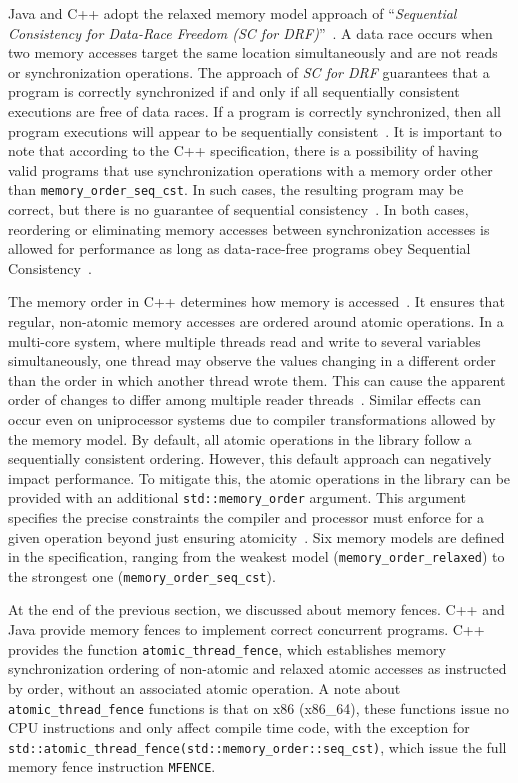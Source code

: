 Java and C++ adopt the relaxed memory model approach of ``\emph{Sequential Consistency for Data-Race Freedom (SC for DRF)}''~\cite{DBLP_conf_isca_AdveH90}.  A data race occurs when two memory accesses target the same location simultaneously and are not reads or synchronization operations. The approach of \emph{SC for DRF} guarantees that a program is correctly synchronized if and only if all sequentially consistent executions are free of data races. If a program is correctly synchronized, then all program executions will appear to be sequentially consistent~\cite{javamemorymodelspec}. It is important to note that according to the C++ specification, there is a possibility of having valid programs that use synchronization operations with a memory order other than \texttt{memory\_order\_seq\_cst}. In such cases, the resulting program may be correct, but there is no guarantee of sequential consistency~\cite{DBLP_conf_pldi_BoehmA08}. In both cases, reordering or eliminating memory accesses between synchronization accesses is allowed for performance as long as data-race-free programs obey Sequential Consistency~\cite{DBLP_series_synthesis_2020Nagarajan}.

The memory order in C++ determines how memory is accessed~\cite{memoryOrderCpp2020}. It ensures that regular, non-atomic memory accesses are ordered around atomic operations. In a multi-core system, where multiple threads read and write to several variables simultaneously, one thread may observe the values changing in a different order than the order in which another thread wrote them. This can cause the apparent order of changes to differ among multiple reader threads~\cite{memoryOrderCpp2020}. Similar effects can occur even on uniprocessor systems due to compiler transformations allowed by the memory model. By default, all atomic operations in the library follow a sequentially consistent ordering. However, this default approach can negatively impact performance. To mitigate this, the atomic operations in the library can be provided with an additional \texttt{std::memory\_order} argument. This argument specifies the precise constraints the compiler and processor must enforce for a given operation beyond just ensuring atomicity~\cite{memoryOrderCpp2020}. Six memory models are defined in the specification, ranging from the weakest model (\texttt{memory\_order\_relaxed}) to the strongest one (\texttt{memory\_order\_seq\_cst}).

At the end of the previous section, we discussed about memory fences. C++ and Java provide memory fences to implement correct concurrent programs. C++ provides the function \texttt{atomic\_thread\_fence}, which establishes memory synchronization ordering of non-atomic and relaxed atomic accesses as instructed by order, without an associated atomic operation. A note about \texttt{atomic\_thread\_fence} functions is that on x86 (x86\_64), these functions issue no CPU instructions and only affect compile time code, with the exception for \texttt{std::atomic\_thread\_fence(std::memory\_order::seq\_cst)}, which issue the full memory fence instruction \texttt{MFENCE}.

